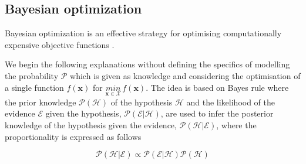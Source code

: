 


 
 

\subsection{Bayesian optimization}

Bayesian optimization is an effective strategy for optimising computationally expensive objective functions \cite{Shahriari}. 

We begin the following explanations without defining the specifics of modelling the probability $\mathcal{P}$ which is given as knowledge and considering the optimisation of a single function $f(\bm{x})$ for $\underset{\bm x \in \mathcal{X}}{min}\,f(\bm{x})$.
The idea is based on Bayes rule where the prior knowledge $\mathcal{P}(\mathcal{H})$ of the hypothesis $\mathcal{H}$ and the likelihood of the evidence $\mathcal{E}$ given the hypothesis, $\mathcal{P}(\mathcal{E}|\mathcal{H})$, are used to infer the posterior knowledge of the hypothesis given the evidence, $\mathcal{P}(\mathcal{H}|\mathcal{E})$, where the proportionality is expressed as follows

\begin{equation}\label{Baye1}
\mathcal{P}(\mathcal{H}|\mathcal{E}) \propto \mathcal{P}(\mathcal{E}|\mathcal{H})\mathcal{P}(\mathcal{H})
\end{equation}

